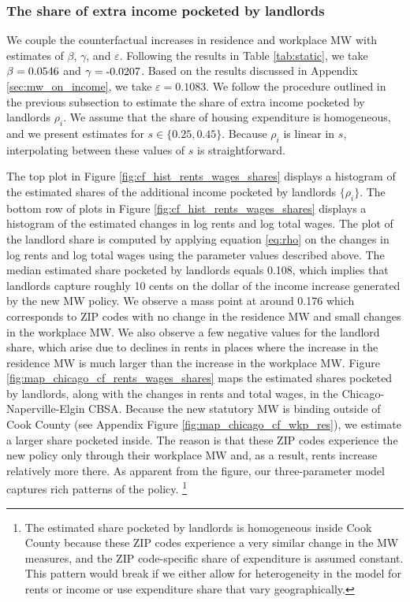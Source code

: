 \subsubsection*{The share of extra income pocketed by landlords}
\label{sec:cf_rents_and_wage_changes}

We couple the counterfactual increases in residence and workplace MW with 
estimates of $\beta$, $\gamma$, and $\varepsilon$.
Following the results in Table \ref{tab:static}, we take 
$\beta = \textnormal{0.0546}$ and 
$\gamma = \textnormal{-0.0207}$.
Based on the results discussed in Appendix \ref{sec:mw_on_income}, we take
$\varepsilon = 0.1083$.
We follow the procedure outlined in the previous subsection to estimate the 
share of extra income pocketed by landlords $\rho_i$.
We assume that the share of housing expenditure is homogeneous, and 
we present estimates for $s\in\{0.25, 0.45\}$.
Because $\rho_i$ is linear in $s$, interpolating between these values of 
$s$ is straightforward.

The top plot in Figure \ref{fig:cf_hist_rents_wages_shares} displays a histogram 
of the estimated shares of the additional income pocketed by landlords 
$\{\rho_i\}$.
The bottom row of plots in Figure \ref{fig:cf_hist_rents_wages_shares} displays 
a histogram of the estimated changes in log rents and log total wages.
The plot of the landlord share is computed by applying equation \eqref{eq:rho} 
on the changes in log rents and log total wages using the parameter values
described above.
The median estimated share pocketed by landlords equals 0.108, which implies 
that landlords capture roughly 10 cents on the dollar of the income increase 
generated by the new MW policy.
We observe a mass point at around 0.176 which corresponds to ZIP codes with
no change in the residence MW and small changes in the workplace MW.
We also observe a few negative values for the landlord share, which
arise due to declines in rents in places where the increase in the residence MW
is much larger than the increase in the workplace MW.
Figure \ref{fig:map_chicago_cf_rents_wages_shares} maps the estimated shares 
pocketed by landlords, along with the changes in rents and total wages, in the 
Chicago-Naperville-Elgin CBSA.
Because the new statutory MW is binding outside of Cook County 
(see Appendix Figure \ref{fig:map_chicago_cf_wkp_res}), 
we estimate a larger share pocketed inside.
The reason is that these ZIP codes experience the new policy only through
their workplace MW and, as a result,
rents increase relatively more there.
As apparent from the figure, our three-parameter model captures rich patterns
of the policy.%
\footnote{The estimated share pocketed by landlords is homogeneous inside 
Cook County because these ZIP codes experience a very similar change in the 
MW measures, and the ZIP code-specific share of expenditure is assumed constant.
This pattern would break if we either allow for heterogeneity in the model for 
rents or income or use expenditure share that vary geographically.}

